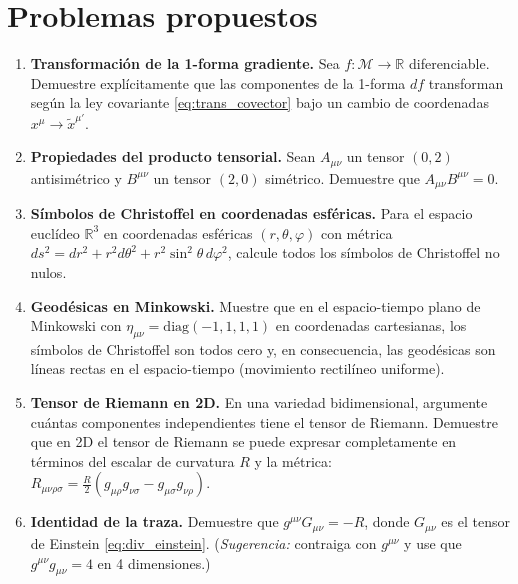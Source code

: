 \section{Problemas propuestos}

\begin{enumerate}[leftmargin=2em, label=\textbf{P\thechapter.\arabic*.}]

  \item \textbf{Transformación de la 1-forma gradiente.} Sea $f: \mathcal{M} \to \mathbb{R}$ diferenciable. Demuestre explícitamente que las componentes de la 1-forma $df$ transforman según la ley covariante \eqref{eq:trans_covector} bajo un cambio de coordenadas $x^\mu \to \tilde{x}^{\mu'}$.

  \item \textbf{Propiedades del producto tensorial.} Sean $A_{\mu\nu}$ un tensor $(0,2)$ antisimétrico y $B^{\mu\nu}$ un tensor $(2,0)$ simétrico. Demuestre que $A_{\mu\nu} B^{\mu\nu} = 0$.

  \item \textbf{Símbolos de Christoffel en coordenadas esféricas.} Para el espacio euclídeo $\mathbb{R}^3$ en coordenadas esféricas $(r, \theta, \varphi)$ con métrica $ds^2 = dr^2 + r^2 d\theta^2 + r^2\sin^2\theta\, d\varphi^2$, calcule todos los símbolos de Christoffel no nulos.

  \item \textbf{Geodésicas en Minkowski.} Muestre que en el espacio-tiempo plano de Minkowski con $\eta_{\mu\nu} = \mathrm{diag}(-1,1,1,1)$ en coordenadas cartesianas, los símbolos de Christoffel son todos cero y, en consecuencia, las geodésicas son líneas rectas en el espacio-tiempo (movimiento rectilíneo uniforme).

  \item \textbf{Tensor de Riemann en 2D.} En una variedad bidimensional, argumente cuántas componentes independientes tiene el tensor de Riemann. Demuestre que en 2D el tensor de Riemann se puede expresar completamente en términos del escalar de curvatura $R$ y la métrica: $R_{\mu\nu\rho\sigma} = \tfrac{R}{2}(g_{\mu\rho}g_{\nu\sigma} - g_{\mu\sigma}g_{\nu\rho})$.

  \item \textbf{Identidad de la traza.} Demuestre que $g^{\mu\nu}G_{\mu\nu} = -R$, donde $G_{\mu\nu}$ es el tensor de Einstein \eqref{eq:div_einstein}. (\textit{Sugerencia:} contraiga con $g^{\mu\nu}$ y use que $g^{\mu\nu}g_{\mu\nu} = 4$ en 4 dimensiones.)


\end{enumerate}
